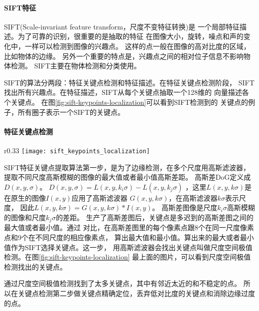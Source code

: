 \paragraph{SIFT特征}
SIFT(Scale-invariant feature transform，尺度不变特征转换)是
一个局部特征描述。\cite{lowe1999object}为了可靠的识别，很重要的是抽取的特征
在图像大小，旋转，噪点和声的变化中，一样可以检测到图像的兴趣点。
这样的点一般在图像的高对比度的区域，比如物体的边缘。
另外一个重要的特点是，兴趣点之间的相对位子信息不影响物体检测。
SIFT主要在物体检测和分类使用。

SIFT的算法分两段：特征关键点检测和特征描述。在特征关键点检测阶段，
SIFT找出所有兴趣点。在特征描述，SIFT从每个关键点抽取一个128维的
向量描述各个关键点。\cite{wiki:sift}
在图\ref{fig:sift-keypoints-localization}可以看到SIFT检测到的
关键点的例子，所有圈子表示一个SIFT的关键点。

\clearpage
\paragraph*{特征关键点检测}
\begin{wrapfigure}{r}{0.33\textwidth}
  \centering
    \texttt{[image: sift\_keypoints\_localization]}
    \caption{SIFT关键点检测过程。图片源：\cite{wiki:sift}}
  \label{fig:sift-keypoints-localization}
\end{wrapfigure}
SIFT特征关键点提取算法第一步，是为了边缘检测，在多个尺度用高斯滤波器，
提取不同尺度高斯模糊的图像的最大值或者最小值高斯差距。
高斯差DoG定义成$D \left( x, y, \sigma \right)$。
$D \left( x, y, \sigma \right) = L \left( x, y, k_i\sigma \right) - L \left( x, y, k_j\sigma \right)$
，这里$L \left( x, y, k\sigma \right)$是在原生的图像$I \left( x, y \right)$应用了高斯滤波器
$G \left( x, y, k\sigma \right)$，在高斯滤波器$k \sigma$表示尺度，
因此$L \left( x, y, k\sigma \right) = G \left( x, y, k\sigma \right) * I \left( x, y \right)$。
高斯差图像是尺度$k_i\sigma$高斯模糊的图像和尺度$k_j\sigma$的差距。
生产了高斯差图后，关键点是多迟到的高斯差图之间的最大值或者最小值。通过
对比，在高斯差图里的每个像素点跟8个在同一尺度像素点和9个在不同尺度的相应像素点，
算出最大值和最小值。算出来的最大或者最小值作为SIFT选择关键点。这一步，
用高斯滤波器会找出关键点叫做尺度空间极值检测。在图\ref{fig:sift-keypoints-localization}
最上面的图片，可以看到尺度空间极值检测找出的关键点。

通过尺度空间极值检测找到了太多关键点，其中有邻近太近的和不稳定的点。
所以在关键点检测第二步做关键点精确定位，丢弃低对比度的关键点和消除边缘过度的点。

